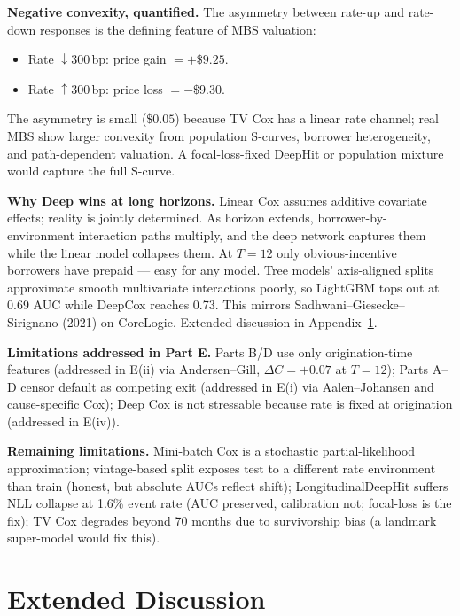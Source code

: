 \documentclass[11pt,a4paper]{article}
\begin{document}
\textbf{Negative convexity, quantified.} The asymmetry between rate-up and rate-down responses is the defining feature of MBS valuation:
\begin{itemize}[leftmargin=1.2em,itemsep=2pt,topsep=2pt]
  \item Rate $\downarrow 300$\,bp: price gain $= +\$9.25$.
  \item Rate $\uparrow 300$\,bp: price loss $= -\$9.30$.
\end{itemize}
The asymmetry is small ($\$0.05$) because TV Cox has a linear rate channel; real MBS show larger convexity from population S-curves, borrower heterogeneity, and path-dependent valuation. A focal-loss-fixed DeepHit or population mixture would capture the full S-curve.


\textbf{Why Deep wins at long horizons.} Linear Cox assumes additive covariate effects; reality is jointly determined. As horizon extends, borrower-by-environment interaction paths multiply, and the deep network captures them while the linear model collapses them. At $T{=}12$ only obvious-incentive borrowers have prepaid --- easy for any model. Tree models' axis-aligned splits approximate smooth multivariate interactions poorly, so LightGBM tops out at 0.69 AUC while DeepCox reaches 0.73. This mirrors Sadhwani--Giesecke--Sirignano (2021) on CoreLogic. Extended discussion in Appendix~\ref{app:discussion}.

\textbf{Limitations addressed in Part E.} Parts B/D use only origination-time features (addressed in E(ii) via Andersen--Gill, $\Delta C = +0.07$ at $T{=}12$); Parts A--D censor default as competing exit (addressed in E(i) via Aalen--Johansen and cause-specific Cox); Deep Cox is not stressable because rate is fixed at origination (addressed in E(iv)).

\textbf{Remaining limitations.} Mini-batch Cox is a stochastic partial-likelihood approximation; vintage-based split exposes test to a different rate environment than train (honest, but absolute AUCs reflect shift); LongitudinalDeepHit suffers NLL collapse at 1.6\% event rate (AUC preserved, calibration not; focal-loss is the fix); TV Cox degrades beyond 70 months due to survivorship bias (a landmark super-model would fix this).

\appendix

\section{Extended Discussion}\label{app:discussion}
\end{document}
